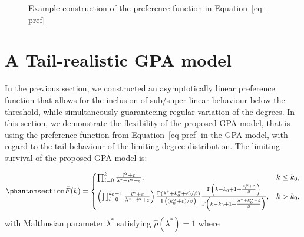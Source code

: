 \documentclass[
  sn-basic,
  10pt,
]{sn-jnl}
\theoremstyle{plain}
\theoremstyle{plain}
\theoremstyle{remark}
\begin{document}
\begin{figure}


\caption{\label{fig-ex}Example construction of the preference function
in Equation~\ref{eq-pref}}

\end{figure}%

\newpage

\section{A Tail-realistic GPA model}\label{sec-model}

In the previous section, we constructed an asymptotically linear
preference function that allows for the inclusion of sub/super-linear
behaviour below the threshold, while simultaneously guaranteeing regular
variation of the degrees. In this section, we demonstrate the
flexibility of the proposed GPA model, that is using the preference
function from Equation~\ref{eq-pref} in the GPA model, with regard to
the tail behaviour of the limiting degree distribution. The limiting
survival of the proposed GPA model is:

\begin{equation}\phantomsection\label{eq-polysurv}{
\bar F(k) = \begin{cases}
\prod_{i=0}^{k}\frac{i^\alpha + \varepsilon}{\lambda^*+i^\alpha + \varepsilon},&k\le k_0,\\
\left(\prod_{i=0}^{k_0-1}\frac{i^\alpha + \varepsilon}{\lambda^*+i^\alpha + \varepsilon}\right)\frac{\Gamma(\lambda^*+k_0^\alpha + \varepsilon)/\beta)}{\Gamma\left((k_0^\alpha + \varepsilon)/\beta\right)} \frac{\Gamma\left(k-k_0 + 1 +\frac{k_0^\alpha + \varepsilon}{\beta}\right)}{\Gamma\left(k-k_0 + 1 +\frac{\lambda^* +k_0^\alpha + \varepsilon}{\beta}\right)},&k > k_0,
\end{cases}
}\end{equation} with Malthusian parameter \(\lambda^*\) satisfying
\(\hat \rho(\lambda^*)=1\) where
\end{document}

